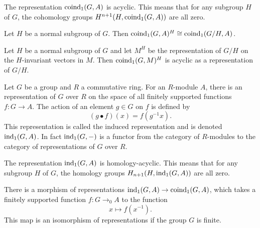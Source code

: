 \begin{lemma}
	The representation $\mathrm{coind}_1(G,A)$ is acyclic. This means that
	for any subgroup $H$ of $G$, the cohomology groups $H^{n+1}(H,\mathrm{coind}_1(G,A))$ are
	all zero.
\end{lemma}

\begin{lemma}
	Let $H$ be a normal subgroup of $G$. Then $\mathrm{coind}_1(G,A)^H \cong \mathrm{coind}_1(G/H,A)$.
\end{lemma}

\begin{corollary}
	Let $H$ be a normal subgroup of $G$ and let $M^H$ be the representation of $G/H$ on the
	$H$-invariant vectors in $M$. Then $\mathrm{coind}_1(G,M)^H$ is acyclic as a representation of $G/H$.
\end{corollary}

\begin{definition}
	Let $G$ be a group and $R$ a commutative ring.
	For an $R$-module $A$, there is an representation of $G$ over $R$
	on the space of all finitely supported functions $f : G \to A$.
	The action of an element $g \in G$ on $f$ is defined by
	\[
		(g \bullet f) (x) = f(g^{-1}x).
	\]
	This representation is called the induced representation and is denoted $\mathrm{ind}_1(G,A)$.
	In fact $\mathrm{ind}_1(G,-)$ is a functor from the category of $R$-modules to the category of
	representations	of $G$ over $R$.
\end{definition}

\begin{lemma}
	The representation $\mathrm{ind}_1(G,A)$ is homology-acyclic. This means that
	for any subgroup $H$ of $G$, the homology groups $H_{n+1}(H,\mathrm{ind}_1(G,A))$ are
	all zero.
\end{lemma}

\begin{definition}
	There is a morphism of representations $\mathrm{ind}_1(G,A) \to \mathrm{coind}_1(G,A)$,
	which takes a finitely supported function $f : G \to_0 A$ to the function
	\[
		x \mapsto f(x^{-1}).
	\]
	This map is an isomorphism of representations if the group $G$ is finite.
\end{definition}

